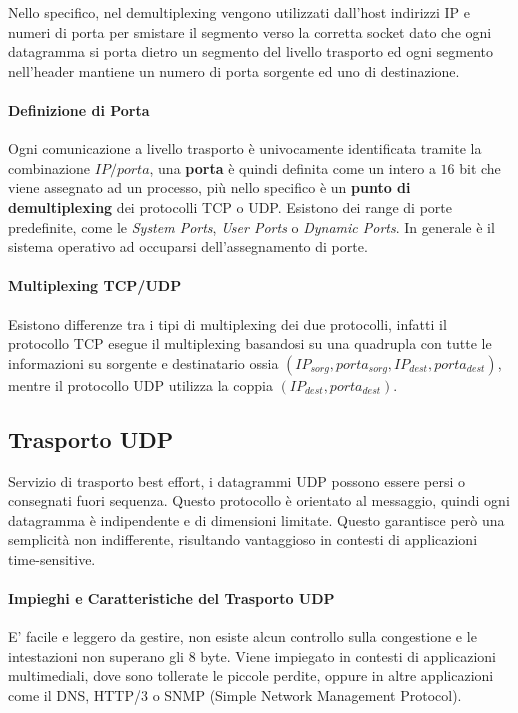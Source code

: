 \documentclass{article}
\begin{document}
Nello specifico, nel demultiplexing vengono utilizzati dall'host indirizzi IP e numeri di porta per smistare il segmento verso la corretta socket dato che ogni datagramma si porta dietro un segmento del
livello trasporto ed ogni segmento nell'header mantiene un numero di porta sorgente ed uno di destinazione.

\paragraph{Definizione di Porta} Ogni comunicazione a livello trasporto è univocamente identificata tramite la combinazione $IP/porta$, una \textbf{porta} è quindi definita come un intero a $16$ bit che viene assegnato
ad un processo, più nello specifico è un \textbf{punto di demultiplexing} dei protocolli TCP o UDP. Esistono dei range di porte predefinite, come le \textit{System Ports}, \textit{User Ports} o \textit{Dynamic Ports}. In generale è il
sistema operativo ad occuparsi dell'assegnamento di porte.

\paragraph{Multiplexing TCP/UDP} Esistono differenze tra i tipi di multiplexing dei due protocolli, infatti il protocollo TCP esegue il multiplexing basandosi su una quadrupla con tutte le informazioni su sorgente e destinatario
ossia $(IP_{sorg}, porta_{sorg}, IP_{dest}, porta_{dest})$, mentre il protocollo UDP utilizza la coppia $(IP_{dest}, porta_{dest})$.

\newpage

\subsection{Trasporto UDP}

Servizio di trasporto best effort, i datagrammi UDP possono essere persi o consegnati fuori sequenza. Questo protocollo è orientato al messaggio, quindi ogni datagramma è indipendente e di dimensioni limitate.
Questo garantisce però una semplicità non indifferente, risultando vantaggioso in contesti di applicazioni time-sensitive.

\paragraph{Impieghi e Caratteristiche del Trasporto UDP} E' facile e leggero da gestire, non esiste alcun controllo sulla congestione e le intestazioni non superano gli $8$ byte. Viene impiegato in contesti di applicazioni multimediali, dove sono tollerate le piccole perdite, oppure in altre applicazioni come il DNS, HTTP/3 o SNMP (Simple Network Management Protocol).
\end{document}

